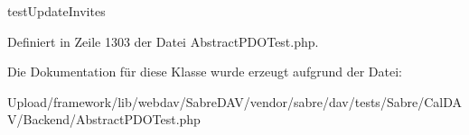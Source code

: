 test\+Update\+Invites 

Definiert in Zeile 1303 der Datei Abstract\+P\+D\+O\+Test.\+php.



Die Dokumentation für diese Klasse wurde erzeugt aufgrund der Datei\+:\begin{DoxyCompactItemize}
\item 
Upload/framework/lib/webdav/\+Sabre\+D\+A\+V/vendor/sabre/dav/tests/\+Sabre/\+Cal\+D\+A\+V/\+Backend/Abstract\+P\+D\+O\+Test.\+php\end{DoxyCompactItemize}

